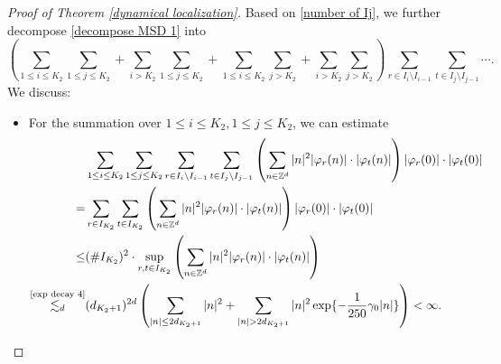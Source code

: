 \documentclass[11pt,reqno,UTF8,twoside]{amsart}
\newcommand{\Z}{\mathbb{Z}}
\theoremstyle{definition}
\numberwithin{equation}{section}
\begin{document}
\begin{proof}[Proof of Theorem \ref{dynamical localization}]
\bigskip

Based on \eqref{number of Ij}, we further decompose \eqref{decompose MSD 1} into 
\begin{equation*}
  \left(\sum_{1\leq i \leq K_2} \sum_{1\leq j\leq K_2} + \sum_{i > K_2} \sum_{1\leq j\leq K_2} +\sum_{1\leq i \leq K_2} \sum_{ j> K_2} + \sum_{ i >K_2} \sum_{ j> K_2}\right)\sum_{r\in I_i\setminus I_{i-1}} \sum_{t\in I_{j}\setminus I_{j-1}}  \cdots .
\end{equation*}
We discuss:
\begin{itemize}
  \item For the summation over ${1\leq i \leq K_2}, {1\leq j\leq K_2}$, we can estimate 
          \begin{align*}
            &\sum_{1\leq i \leq K_2} \sum_{1\leq j\leq K_2}  \sum_{r\in I_i\setminus I_{i-1}} \sum_{t\in I_{j}\setminus I_{j-1}} \left( \sum_{n\in \Z^d}  |n|^2 |\varphi_r(n)|\cdot |\varphi_t(n)|\right) |\varphi_r(0)| \cdot | \varphi_t(0)| \\
                    =&  \sum_{r\in I_{K_2}} \sum_{t\in I_{K_2}} \left( \sum_{n\in \Z^d}  |n|^2 |\varphi_r(n)|\cdot |\varphi_t(n)|\right) |\varphi_r(0)| \cdot | \varphi_t(0)| \\
                    \leq & (\# I_{K_2})^2 \cdot \sup_{r,t\in I_{K_2}}\left(   \sum_{n\in \Z^d}  |n|^2 |\varphi_r(n)|\cdot |\varphi_t(n)| \right) \\
                    \overset{\text{\eqref{exp decay 4}}}{\lesssim_d } & (d_{K_2+1})^{2d} \left( \sum_{|n|\leq 2d_{K_2+1} }|n|^2 +\sum_{|n|>2d_{K_2+1}} |n|^2 \exp\{-\frac{1}{250}\gamma_0 |n|\}\right) <\infty. 
          \end{align*}


\end{itemize}
\end{proof}
\end{document}

